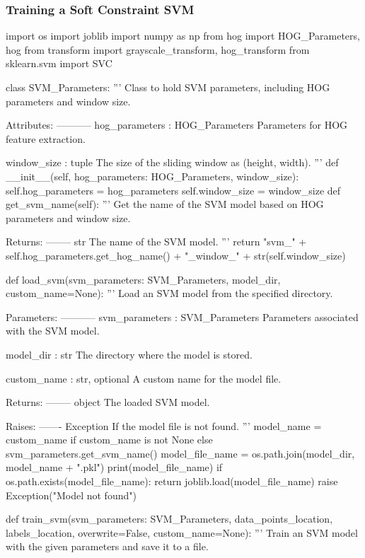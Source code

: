 \subsubsection{Training a Soft Constraint SVM}\label{appendix:training_svm}
\begin{pythoncode}
import os
import joblib
import numpy as np
from hog import HOG_Parameters, hog
from transform import grayscale_transform, hog_transform
from sklearn.svm import SVC

class SVM_Parameters:
    '''
    Class to hold SVM parameters, including HOG parameters and window size.

    Attributes:
    -----------
    hog_parameters : HOG_Parameters
        Parameters for HOG feature extraction.
    
    window_size : tuple
        The size of the sliding window as (height, width).
    '''
    def __init__(self, hog_parameters: HOG_Parameters, window_size):
        self.hog_parameters = hog_parameters
        self.window_size = window_size
    def get_svm_name(self):
        '''
        Get the name of the SVM model based on HOG parameters and window size.

        Returns:
        --------
        str
            The name of the SVM model.
        '''
        return "svm_" + self.hog_parameters.get_hog_name() + "_window_" + str(self.window_size)

def load_svm(svm_parameters: SVM_Parameters, model_dir, custom_name=None):
    '''
    Load an SVM model from the specified directory.

    Parameters:
    -----------
    svm_parameters : SVM_Parameters
        Parameters associated with the SVM model.
    
    model_dir : str
        The directory where the model is stored.
    
    custom_name : str, optional
        A custom name for the model file.

    Returns:
    --------
    object
        The loaded SVM model.
    
    Raises:
    -------
    Exception
        If the model file is not found.
    '''
    model_name = custom_name if custom_name is not None else svm_parameters.get_svm_name()
    model_file_name = os.path.join(model_dir, model_name + ".pkl")
    print(model_file_name)
    if os.path.exists(model_file_name):
        return joblib.load(model_file_name)
    raise Exception("Model not found")

def train_svm(svm_parameters: SVM_Parameters, data_points_location, labels_location, overwrite=False, custom_name=None):
    '''
    Train an SVM model with the given parameters and save it to a file.


\end{pythoncode}

